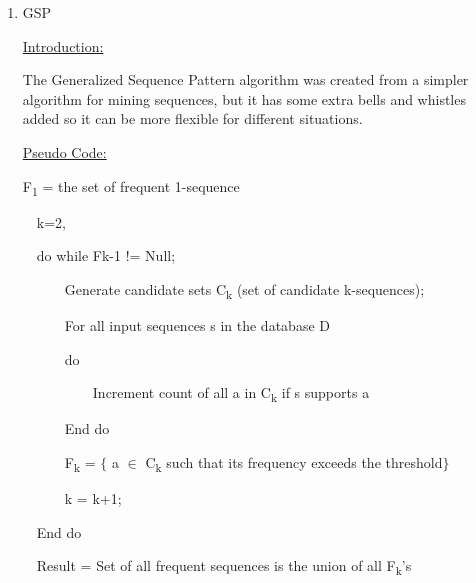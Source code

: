 \documentclass[12pt]{article}
\renewcommand{\_}{\kern-1.5pt\textunderscore\kern-1.5pt}
\begin{document}
\vspace{\baselineskip}
\begin{enumerate}
	\item {\fontsize{20pt}{24.0pt}\selectfont GSP\par}\par

{\fontsize{14pt}{16.8pt}\selectfont \uline{Introduction:}\par}\par

The Generalized Sequence Pattern algorithm was created from a simpler algorithm for mining sequences, but it has some extra bells and whistles added so it can be more flexible for different situations.\par

{\fontsize{14pt}{16.8pt}\selectfont \uline{Pseudo Code:}\par}\par

F\textsubscript{1} = the set of frequent 1-sequence\par

\ \  k=2,\par

\ \  do while Fk-1 != Null;\par

\ \ \ \ \ \  Generate candidate sets C\textsubscript{k} (set of candidate k-sequences);\par

\ \ \ \ \ \  For all input sequences s in the database D\par

\ \ \ \ \ \  do\par

\ \ \ \ \ \ \ \ \ \  Increment count of all a in C\textsubscript{k} if s supports a\par

\ \ \ \ \ \  End do\par

\ \ \ \ \ \  F\textsubscript{k} = $ \{ $ a $ \in $  C\textsubscript{k} such that its frequency exceeds the threshold$ \} $ \par

\ \ \ \ \ \  k = k+1;\par

\ \  End do\par

\ \  Result = Set of all frequent sequences is the union of all F\textsubscript{k}'s\par



\end{enumerate}
\end{document}
